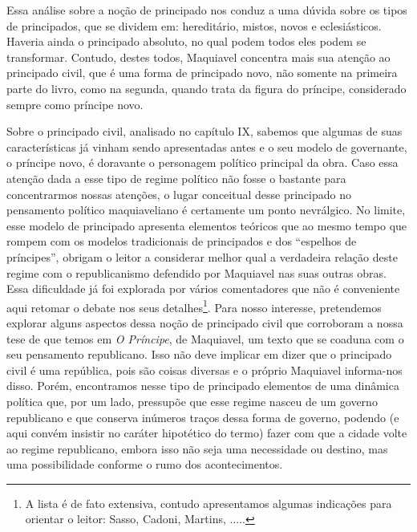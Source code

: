 Essa análise sobre a noção de principado nos conduz a uma dúvida sobre
os tipos de principados, que se dividem em: hereditário, mistos, novos e
eclesiásticos. Haveria ainda o principado absoluto, no qual podem todos
eles podem se transformar. Contudo, destes todos, Maquiavel concentra
mais sua atenção ao principado civil, que é uma forma de principado
novo, não somente na primeira parte do livro, como na segunda, quando
trata da figura do príncipe, considerado sempre como príncipe novo.

Sobre o principado civil, analisado no capítulo IX, sabemos que algumas
de suas características já vinham sendo apresentadas antes e o seu
modelo de governante, o príncipe novo, é doravante o personagem político
principal da obra. Caso essa atenção dada a esse tipo de regime político
não fosse o bastante para concentrarmos nossas atenções, o lugar
conceitual desse principado no pensamento político maquiaveliano é
certamente um ponto nevrálgico. No limite, esse modelo de principado
apresenta elementos teóricos que ao mesmo tempo que rompem com os
modelos tradicionais de principados e dos ``espelhos de príncipes'',
obrigam o leitor a considerar melhor qual a verdadeira relação deste
regime com o republicanismo defendido por Maquiavel nas suas outras
obras. Essa dificuldade já foi explorada por vários comentadores que não
é conveniente aqui retomar o debate nos seus detalhes\footnote{A lista é
  de fato extensiva, contudo apresentamos algumas indicações para
  orientar o leitor: Sasso, Cadoni, Martins, .....}. Para nosso
interesse, pretendemos explorar alguns aspectos dessa noção de
principado civil que corroboram a nossa tese de que temos em \emph{O
Príncipe}, de Maquiavel, um texto que se coaduna com o seu pensamento
republicano. Isso não deve implicar em dizer que o principado civil é
uma república, pois são coisas diversas e o próprio Maquiavel
informa-nos disso. Porém, encontramos nesse tipo de principado elementos
de uma dinâmica política que, por um lado, pressupõe que esse regime
nasceu de um governo republicano e que conserva inúmeros traços dessa
forma de governo, podendo (e aqui convém insistir no caráter hipotético
do termo) fazer com que a cidade volte ao regime republicano, embora
isso não seja uma necessidade ou destino, mas uma possibilidade conforme
o rumo dos acontecimentos.

